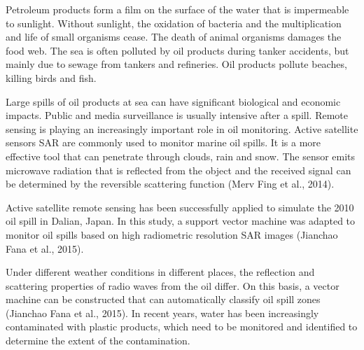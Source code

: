 \begin{example} 
	\label{exa:oil}
	Petroleum products form a film on the surface of the water that is impermeable to sunlight. Without sunlight, the oxidation of bacteria and the multiplication and life of small organisms cease. The death of animal organisms damages the food web. The sea is often polluted by oil products during tanker accidents, but mainly due to sewage from tankers and refineries. Oil products pollute beaches, killing birds and fish.
	
	Large spills of oil products at sea can have significant biological and economic impacts.
	Public and media surveillance is usually intensive after a spill. Remote sensing is playing an increasingly important role in oil monitoring. Active satellite sensors SAR are commonly used to monitor marine oil spills. It is a more effective tool that can penetrate through clouds, rain and snow. The sensor emits microwave radiation that is reflected from the object and the received signal can be determined by the reversible scattering function (Merv Fing et al., 2014).
	
	Active satellite remote sensing has been successfully applied to simulate the 2010 oil spill in Dalian, Japan. In this study, a support vector machine was adapted to monitor oil spills based on high radiometric resolution SAR images (Jianchao Fana et al., 2015).
	
	Under different weather conditions in different places, the reflection and scattering properties of radio waves from the oil differ. On this basis, a vector machine can be constructed that can automatically classify oil spill zones (Jianchao Fana et al., 2015).
	In recent years, water has been increasingly contaminated with plastic products, which need to be monitored and identified to determine the extent of the contamination.
\end{example}

